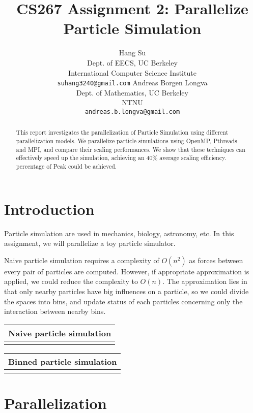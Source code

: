 \documentclass[11pt]{article}
\title{CS267 Assignment 2: Parallelize Particle Simulation}
\author{Hang Su \\
  Dept. of EECS, UC Berkeley \\
  International Computer Science Institute \\
  {\tt suhang3240@gmail.com}
  \And
  Andreas Borgen Longva \\
  Dept. of Mathematics, UC Berkeley \\
  NTNU \\
  {\tt andreas.b.longva@gmail.com}
}
\date{}
\begin{document}
\maketitle
\vspace{-8mm}
\begin{abstract}
This report investigates the parallelization of Particle Simulation using different parallelization models. 
We parallelize particle simulations using OpenMP, Pthreads and MPI, and compare their scaling performances.
We show that these techniques can effectively speed up the simulation, achieving an 40\% average scaling efficiency.
percentage of Peak could be achieved.
\end{abstract}

\section{Introduction}
Particle simulation are used in mechanics, biology, astronomy, etc. In this assignment, we will parallelize 
a toy particle simulator.

Naive particle simulation requires a complexity of $O(n^2)$ as forces between every pair of particles are computed.
However, if appropriate approximation is applied, we could reduce the complexity to $O(n)$. The approximation lies in
that only nearby particles have big influences on a particle, so we could divide the spaces into bins, and 
update status of each particles concerning only the interaction between nearby bins.

\begin{table}[htb]
  \centering
  \begin{tabular}{l}
    \hline
      Naive particle simulation\\
    \hline
      \\
    \hline
  \end{tabular}
  \label{tab:naive}
\end{table}

\begin{table}[htb]
  \centering
  \begin{tabular}{l}
    \hline
      Binned particle simulation\\
    \hline
      \\
    \hline
  \end{tabular}
  \label{tab:serial}
\end{table}

\section{Parallelization}
\end{document}
